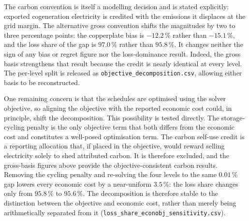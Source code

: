 The carbon convention is itself a modelling decision and is stated explicitly: exported
cogeneration electricity is credited with the emissions it displaces at the grid margin. The
alternative gross convention shifts the magnitudes by two to three percentage points: the
copperplate bias is \(-12.2\,\%\) rather than \(-15.1\,\%\), and the loss share of the gap is
\(97.0\,\%\) rather than \(95.8\,\%\). It changes neither the sign of any bias or regret figure
nor the loss-dominance result. Indeed, the gross basis strengthens that result because the
credit is nearly identical at every level. The per-level split is released as
\texttt{objective\_decomposition.csv}, allowing either basis to be reconstructed.

One remaining concern is that the schedules are optimised using the solver objective, so
aligning the objective with the reported economic cost could, in principle, shift the
decomposition. This possibility is tested directly. The storage-cycling penalty is the only
objective term that both differs from the economic cost and constitutes a well-posed
optimisation term. The carbon self-use credit is a reporting allocation that, if placed in the
objective, would reward selling electricity solely to shed attributed carbon. It is therefore
excluded, and the gross-basis figures above provide the objective-consistent carbon results.
Removing the cycling penalty and re-solving the four levels to the same \(0.01\,\%\) gap lowers
every economic cost by a near-uniform \(3.5\,\%\): the loss share changes only from \(95.8\,\%\)
to \(95.6\,\%\). The decomposition is therefore stable to the distinction between the objective
and economic cost, rather than merely being arithmetically separated from it
(\texttt{loss\_share\_econobj\_sensitivity.csv}).
